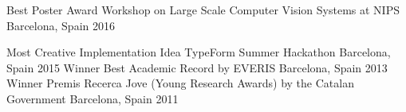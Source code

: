 

\begin{cvhonors}

  \cvhonor
    {Best Poster Award} %
    {Workshop on Large Scale Computer Vision Systems at NIPS} %
    {Barcelona, Spain} %
    {2016} %

\end{cvhonors}



\begin{cvhonors}
  \cvhonor
    {Most Creative Implementation Idea} %
    {TypeForm Summer Hackathon} %
    {Barcelona, Spain} %
    {2015} %
  \cvhonor
    {Winner} %
    {Best Academic Record by EVERIS} %
    {Barcelona, Spain} %
    {2013} %
  \cvhonor
    {Winner} %
    {Premis Recerca Jove (Young Research Awards) by the Catalan Government} %
    {Barcelona, Spain} %
    {2011} %

\end{cvhonors}
